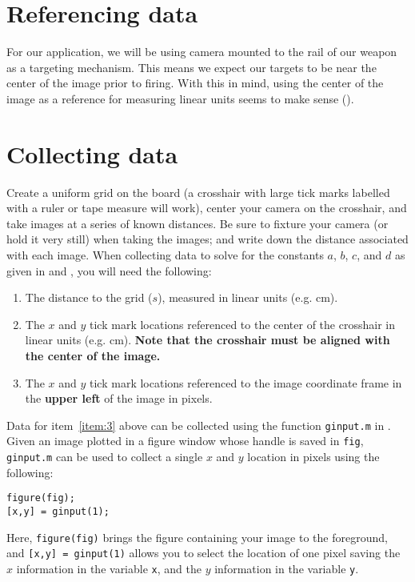 \documentclass{tufte-handout}
\begin{document}
\section{Referencing data}
For our application, we will be using camera mounted to the rail of our weapon as a targeting mechanism. This means we expect our targets to be near the center of the image prior to firing. With this in mind, using the center of the image as a reference for measuring linear units seems to make sense ().

\section{Collecting data}

Create a uniform grid on the board (a crosshair with large tick marks labelled with a ruler or tape measure will work), center your camera on the crosshair, and take images at a series of known distances. Be sure to fixture your camera (or hold it very still) when taking the images; and write down the distance associated with each image. 
When collecting data to solve for the constants $a$, $b$, $c$, and $d$ as given in  and , you will need the following:
\begin{enumerate}
\item The distance to the grid ($s$), measured in linear units (e.g. \si{\centi\meter}).
\item The $x$ and $y$ tick mark locations referenced to the center of the crosshair in linear units (e.g. \si{\centi\meter}). \textbf{Note that the crosshair must be aligned with the center of the image.}
\item\label{item:3} The $x$ and $y$ tick mark locations referenced to the image coordinate frame in the \textbf{upper left} of the image in pixels.
\end{enumerate}

Data for item~\ref{item:3} above can be collected using the function \lstinline{ginput.m} in \Matlab. Given an image plotted in a figure window whose handle is saved in \lstinline{fig}, \lstinline{ginput.m} can be used to collect a single $x$ and $y$  location in pixels using the following:
\begin{lstlisting}[style=usnaMatlab]
figure(fig);
[x,y] = ginput(1);
\end{lstlisting}
Here, \lstinline{figure(fig)} brings the figure containing your image to the foreground, and \lstinline{[x,y] = ginput(1)} allows you to select the location of one pixel saving the $x$ information in the variable \lstinline{x}, and the $y$ information in the variable \lstinline{y}. 
\end{document}
